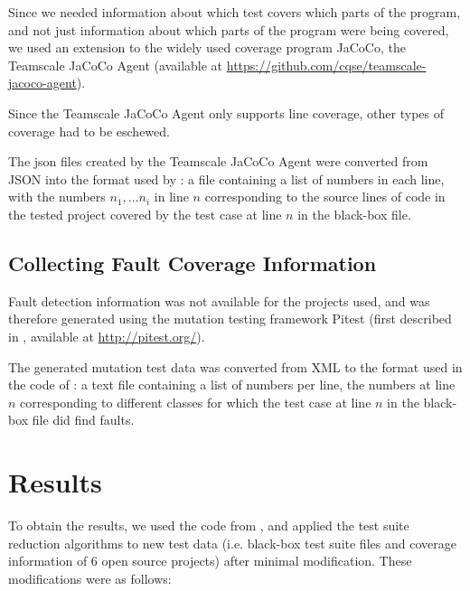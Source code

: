 Since we needed information about which test covers which parts
of the program, and not just information about which parts of the
program were being covered, we used an extension to the widely used
coverage program JaCoCo, the Teamscale JaCoCo Agent (available at
\url{https://github.com/cqse/teamscale-jacoco-agent}).

Since the Teamscale JaCoCo Agent only supports line coverage, other
types of coverage had to be eschewed.

The json files created by the Teamscale JaCoCo Agent were converted
from JSON into the format used by \cite{cruciani2019scalable}: a file
containing a list of numbers in each line, with the numbers $n_1, \dots
n_i$ in line $n$ corresponding to the source lines of code in the tested
project covered by the test case at line $n$ in the black-box file.

\subsection{Collecting Fault Coverage Information}

Fault detection information was not available for the projects used, and
was therefore generated using the mutation testing framework Pitest (first
described in \cite{coles2016pit}, available at \url{http://pitest.org/}).

The generated mutation test data was converted from XML to the format
used in the code of \cite{cruciani2019scalable}: a text file containing
a list of numbers per line, the numbers at line $n$ corresponding to
different classes for which the test case at line $n$ in the black-box
file did find faults.

\section{Results}

To obtain the results, we used the code from \cite{cruciani2019scalable},
and applied the test suite reduction algorithms to new test data
(i.e. black-box test suite files and coverage information of 6 open source
projects) after minimal modification. These modifications were as follows:

